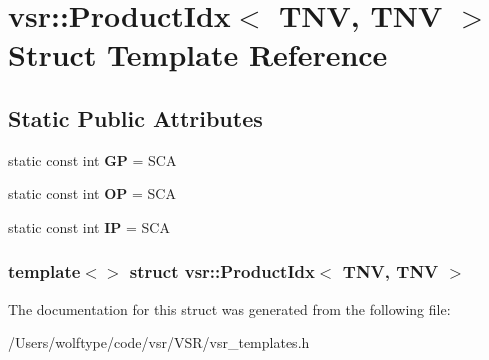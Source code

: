 \hypertarget{structvsr_1_1_product_idx_3_01_t_n_v_00_01_t_n_v_01_4}{\section{vsr\-:\-:Product\-Idx$<$ T\-N\-V, T\-N\-V $>$ Struct Template Reference}
\label{structvsr_1_1_product_idx_3_01_t_n_v_00_01_t_n_v_01_4}
}
\subsection*{Static Public Attributes}
\begin{DoxyCompactItemize}
\item 
\hypertarget{structvsr_1_1_product_idx_3_01_t_n_v_00_01_t_n_v_01_4_a68af1c6aa22ecc68790b1e7bd12193c5}{static const int {\bfseries G\-P} = S\-C\-A}\label{structvsr_1_1_product_idx_3_01_t_n_v_00_01_t_n_v_01_4_a68af1c6aa22ecc68790b1e7bd12193c5}

\item 
\hypertarget{structvsr_1_1_product_idx_3_01_t_n_v_00_01_t_n_v_01_4_aaf3d306dd37d0f5eea08438689473d17}{static const int {\bfseries O\-P} = S\-C\-A}\label{structvsr_1_1_product_idx_3_01_t_n_v_00_01_t_n_v_01_4_aaf3d306dd37d0f5eea08438689473d17}

\item 
\hypertarget{structvsr_1_1_product_idx_3_01_t_n_v_00_01_t_n_v_01_4_a460a285e3d179e5f2fbc7f8bf5807472}{static const int {\bfseries I\-P} = S\-C\-A}\label{structvsr_1_1_product_idx_3_01_t_n_v_00_01_t_n_v_01_4_a460a285e3d179e5f2fbc7f8bf5807472}

\end{DoxyCompactItemize}
\subsubsection*{template$<$$>$ struct vsr\-::\-Product\-Idx$<$ T\-N\-V, T\-N\-V $>$}



The documentation for this struct was generated from the following file\-:\begin{DoxyCompactItemize}
\item 
/\-Users/wolftype/code/vsr/\-V\-S\-R/vsr\-\_\-templates.\-h\end{DoxyCompactItemize}
